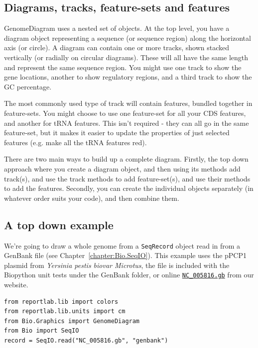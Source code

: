 \documentclass{report}
\begin{document}
\subsection{Diagrams, tracks, feature-sets and features}

GenomeDiagram uses a nested set of objects.  At the top level, you have a diagram
object representing a sequence (or sequence region) along the horizontal axis (or
circle).  A diagram can contain one or more tracks, shown stacked vertically (or
radially on circular diagrams).  These will all have the same length and represent
the same sequence region.  You might use one track to show the gene locations,
another to show regulatory regions, and a third track to show the GC percentage.

The most commonly used type of track will contain features, bundled together in
feature-sets.  You might choose to use one feature-set for all your CDS features,
and another for tRNA features.  This isn't required - they can all go in the same
feature-set, but it makes it easier to update the properties of just selected
features (e.g. make all the tRNA features red).

There are two main ways to build up a complete diagram.  Firstly, the top down
approach where you create a diagram object, and then using its methods add
track(s), and use the track methods to add feature-set(s), and use their
methods to add the features.  Secondly, you can create the individual objects
separately (in whatever order suits your code), and then combine them.

\subsection{A top down example}
\label{sec:gd_top_down}

We're going to draw a whole genome from a \verb|SeqRecord| object read in from
a GenBank file (see Chapter~\ref{chapter:Bio.SeqIO}).  This example uses the
pPCP1 plasmid from \textit{Yersinia pestis biovar Microtus}, the file is
included with the Biopython unit tests under the GenBank folder, or online
\href{http://biopython.org/SRC/biopython/Tests/GenBank/NC_005816.gb}
{\texttt{NC\_005816.gb}} from our website.

\begin{verbatim}
from reportlab.lib import colors
from reportlab.lib.units import cm
from Bio.Graphics import GenomeDiagram
from Bio import SeqIO
record = SeqIO.read("NC_005816.gb", "genbank")
\end{verbatim}
\end{document}
